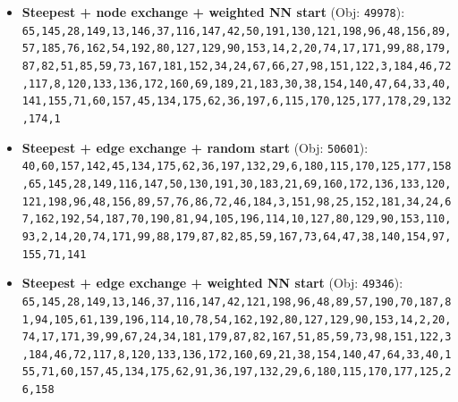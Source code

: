 \begin{itemize}[leftmargin=1.5em]
    \item \textbf{Steepest + node exchange + weighted NN start} (Obj: \texttt{49978}):\\
    \texttt{65,145,28,149,13,146,37,116,147,42,50,191,130,121,198,96,48,156,89,57,185,76,162,54,192,80,127,129,90,153,14,2,20,74,17,171,99,88,179,87,82,51,85,59,73,167,181,152,34,24,67,66,27,98,151,122,3,184,46,72,117,8,120,133,136,172,160,69,189,21,183,30,38,154,140,47,64,33,40,141,155,71,60,157,45,134,175,62,36,197,6,115,170,125,177,178,29,132,174,1}
    \item \textbf{Steepest + edge exchange + random start} (Obj: \texttt{50601}):\\
    \texttt{40,60,157,142,45,134,175,62,36,197,132,29,6,180,115,170,125,177,158,65,145,28,149,116,147,50,130,191,30,183,21,69,160,172,136,133,120,121,198,96,48,156,89,57,76,86,72,46,184,3,151,98,25,152,181,34,24,67,162,192,54,187,70,190,81,94,105,196,114,10,127,80,129,90,153,110,93,2,14,20,74,171,99,88,179,87,82,85,59,167,73,64,47,38,140,154,97,155,71,141}
    \item \textbf{Steepest + edge exchange + weighted NN start} (Obj: \texttt{49346}):\\
    \texttt{65,145,28,149,13,146,37,116,147,42,121,198,96,48,89,57,190,70,187,81,94,105,61,139,196,114,10,78,54,162,192,80,127,129,90,153,14,2,20,74,17,171,39,99,67,24,34,181,179,87,82,167,51,85,59,73,98,151,122,3,184,46,72,117,8,120,133,136,172,160,69,21,38,154,140,47,64,33,40,155,71,60,157,45,134,175,62,91,36,197,132,29,6,180,115,170,177,125,26,158}
\end{itemize}
